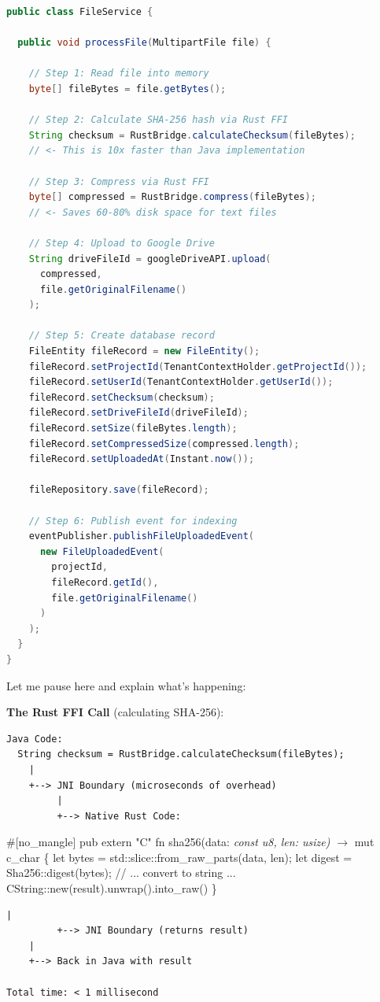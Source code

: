 \documentclass[11pt,a4paper]{report}
\begin{document}
\begin{lstlisting}[language=Java]
public class FileService {
  
  public void processFile(MultipartFile file) {
    
    // Step 1: Read file into memory
    byte[] fileBytes = file.getBytes();
    
    // Step 2: Calculate SHA-256 hash via Rust FFI
    String checksum = RustBridge.calculateChecksum(fileBytes);
    // <- This is 10x faster than Java implementation
    
    // Step 3: Compress via Rust FFI
    byte[] compressed = RustBridge.compress(fileBytes);
    // <- Saves 60-80% disk space for text files
    
    // Step 4: Upload to Google Drive
    String driveFileId = googleDriveAPI.upload(
      compressed,
      file.getOriginalFilename()
    );
    
    // Step 5: Create database record
    FileEntity fileRecord = new FileEntity();
    fileRecord.setProjectId(TenantContextHolder.getProjectId());
    fileRecord.setUserId(TenantContextHolder.getUserId());
    fileRecord.setChecksum(checksum);
    fileRecord.setDriveFileId(driveFileId);
    fileRecord.setSize(fileBytes.length);
    fileRecord.setCompressedSize(compressed.length);
    fileRecord.setUploadedAt(Instant.now());
    
    fileRepository.save(fileRecord);
    
    // Step 6: Publish event for indexing
    eventPublisher.publishFileUploadedEvent(
      new FileUploadedEvent(
        projectId,
        fileRecord.getId(),
        file.getOriginalFilename()
      )
    );
  }
}
\end{lstlisting}

Let me pause here and explain what's happening:

\textbf{The Rust FFI Call} (calculating SHA-256):

\begin{lstlisting}[language=text]
Java Code:
  String checksum = RustBridge.calculateChecksum(fileBytes);
    |
    +--> JNI Boundary (microseconds of overhead)
         |
         +--> Native Rust Code:
\end{lstlisting}
             \#[no\_mangle]
             pub extern "C" fn sha256(data: \textit{const u8, len: usize) $\rightarrow$ }mut c\_char \{
               let bytes = std::slice::from\_raw\_parts(data, len);
               let digest = Sha256::digest(bytes);
               // ... convert to string ...
               CString::new(result).unwrap().into\_raw()
             \}
\begin{lstlisting}[language=text]
         |
         +--> JNI Boundary (returns result)
    |
    +--> Back in Java with result

Total time: < 1 millisecond
\end{lstlisting}
\end{document}
